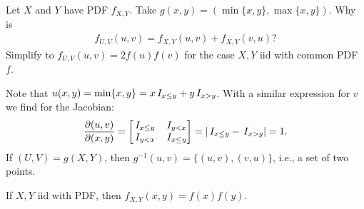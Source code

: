 \begin{exercise}
Let $X$ and $Y$ have PDF $f_{X,Y}$. Take $g(x,y) = (\min\{x,y\}, \max\{x,y\})$.
Why is
\begin{align*}
f_{U,V}(u,v) = f_{X,Y}(u, v) + f_{X,Y}(v, u)?
\end{align*}
Simplify to $f_{U,V}(u,v) = 2f(u)f(v)$ for the case $X, Y$ iid with common PDF $f$.
\begin{solution}
Note that $u(x,y)=\min\{x,y\} = x\,I_{x\leq y} + y\,I_{x> y}$. With a similar expression for $v$ we find for the Jacobian:
\begin{align*}
\frac{\partial(u,v)}{\partial(x,y)} =
\begin{bmatrix}
\,I_{x\leq y} & \,I_{y < x} \\
\,I_{y<x} & \,I_{x\leq y}
\end{bmatrix} = |\,I_{x\leq y} - \,I_{x>y}| = 1.
\end{align*}
If $(U,V) = g(X,Y)$, then $g^{-1}(u,v) = \{(u,v), (v,u)\}$, i.e., a set of two points.

If $X,Y$ iid with PDF, then $f_{X,Y}(x,y) = f(x)f(y)$.
\end{solution}
\end{exercise}

